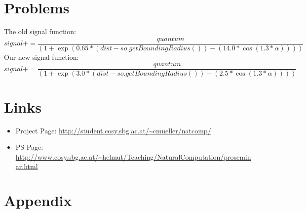 \documentclass[12pt,fleqn,a4paper]{article}
\begin{document}
\section{Problems}
The old signal function:
\[signal += \frac{quantum}{(1 + \exp(0.65 * (dist - so.getBoundingRadius()) - (14.0 * \cos(1.3 * \alpha))))}\]
Our new signal function:
\[signal += \frac{quantum}{(1 + \exp(3.0 * (dist - so.getBoundingRadius()) - (2.5 * \cos(1.3 * \alpha))))}\]

\newpage
\section{Links}

\begin{itemize}
\item Project Page: \url{http://student.cosy.sbg.ac.at/~cmueller/natcomp/}
\item PS Page: \url{http://www.cosy.sbg.ac.at/~helmut/Teaching/NaturalComputation/proseminar.html}
\end{itemize}




\section{Appendix}
\end{document}
